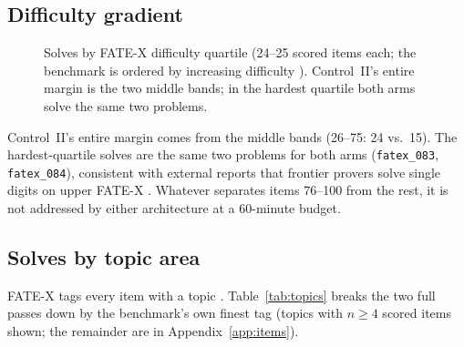 \documentclass[12pt, a4paper]{article}
\newcommand{\run}[1]{\texttt{#1}}
\begin{document}
\subsection{Difficulty gradient}
\label{sec:difficulty}

\begin{figure}[H]
\centering
{}
\caption{Solves by FATE-X difficulty quartile (24--25 scored items each; the
benchmark is ordered by increasing difficulty \cite{fatex2025}). Control~II's
entire margin is the two middle bands; in the hardest quartile both arms solve
the same two problems.}
\label{fig:bands}
\end{figure}

Control~II's entire margin comes from the middle bands (26--75: 24 vs.\ 15).
The hardest-quartile solves are the same two problems for both arms
(\run{fatex\_083}, \run{fatex\_084}), consistent with external reports that
frontier provers solve single digits on upper FATE-X
\cite{benchmarklist_fatex}. Whatever separates items 76--100 from the rest, it
is not addressed by either architecture at a 60-minute budget.

\subsection{Solves by topic area}
\label{sec:topics}

FATE-X tags every item with a topic \cite{fatex2025}. Table~\ref{tab:topics}
breaks the two full passes down by the benchmark's own finest tag (topics with
$n\ge4$ scored items shown; the remainder are in
Appendix~\ref{app:items}).
\end{document}
